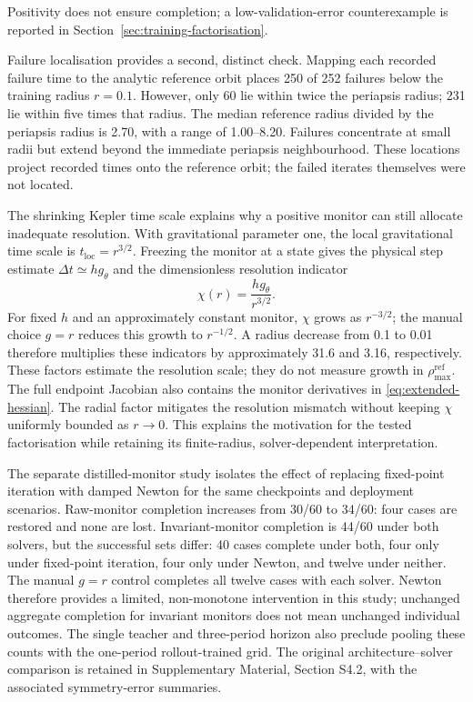 \documentclass[final,3p,times]{elsarticle}
\begin{document}
Positivity does not ensure completion; a low-validation-error counterexample
is reported in Section~\ref{sec:training-factorisation}.

Failure localisation provides a second, distinct check. Mapping each
recorded failure time to the analytic reference orbit places 250 of
252 failures below the training radius $r=0.1$. However, only 60 lie
within twice the periapsis radius; 231 lie within five times that radius.
The median reference radius divided by the periapsis radius is 2.70,
with a range of 1.00--8.20. Failures concentrate at small radii but extend beyond the immediate
periapsis neighbourhood. These locations project recorded times onto the reference orbit;
the failed iterates themselves were not located.

The shrinking Kepler time scale explains why a positive monitor can still
allocate inadequate resolution. With gravitational parameter one, the
local gravitational time scale is $t_{\mathrm{loc}}=r^{3/2}$. Freezing
the monitor at a state gives the physical step estimate $\Delta t\simeq
hg_\theta$ and the dimensionless resolution indicator
\begin{equation}
 \chi(r)=\frac{hg_\theta}{r^{3/2}}.
 \label{eq:kepler-resolution-scale}
\end{equation}
For fixed $h$ and an approximately constant monitor, $\chi$ grows as
$r^{-3/2}$; the manual choice $g=r$ reduces this growth to $r^{-1/2}$.
A radius decrease from 0.1 to 0.01 therefore multiplies these indicators
by approximately 31.6 and 3.16, respectively. These factors estimate the resolution scale;
they do not measure growth in $\rho_{\max}^{\mathrm{ref}}$. The full
endpoint Jacobian also contains the monitor derivatives in
\eqref{eq:extended-hessian}. The radial factor mitigates the resolution
mismatch without keeping $\chi$ uniformly bounded as $r\to0$.
This explains the motivation for the tested factorisation while retaining
its finite-radius, solver-dependent interpretation.

The separate distilled-monitor study isolates the effect of replacing
fixed-point iteration with damped Newton for the same checkpoints and
deployment scenarios. Raw-monitor completion increases from 30/60 to
34/60: four cases are restored and none are lost. Invariant-monitor
completion is 44/60 under both solvers, but the successful sets differ:
40 cases complete under both, four only under fixed-point iteration,
four only under Newton, and twelve under neither. The manual $g=r$
control completes all twelve cases with each solver. Newton therefore
provides a limited, non-monotone intervention in this study; unchanged
aggregate completion for invariant monitors does not mean unchanged
individual outcomes. The single teacher and three-period horizon also
preclude pooling these counts with the one-period rollout-trained grid.
The original architecture--solver comparison is retained in Supplementary
Material, Section S4.2, with the associated symmetry-error summaries.
\end{document}
